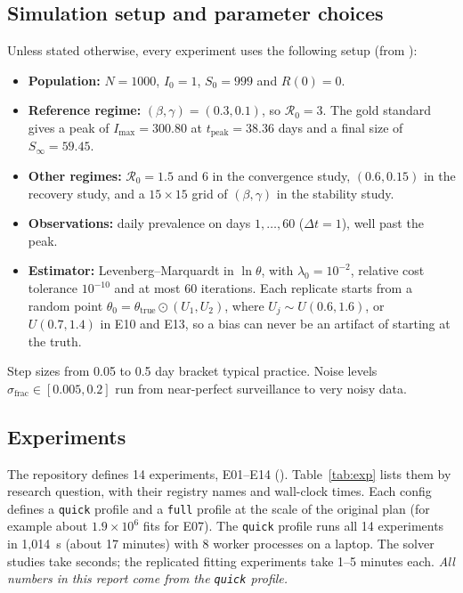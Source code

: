 \documentclass[sigconf]{acmart}
\begin{document}
\subsection{Simulation setup and parameter choices}
Unless stated otherwise, every experiment uses the following setup
(from ):
\begin{itemize}
  \item \textbf{Population:} $N=1000$, $I_0=1$, $S_0=999$ and $R(0)=0$.
  \item \textbf{Reference regime:} $(\beta,\gamma)=(0.3,0.1)$, so
    $\mathcal R_0=3$. The gold standard gives a peak of
    $I_{\max}=300.80$ at $t_{\mathrm{peak}}=38.36$ days and a final size
    of $S_\infty=59.45$.
  \item \textbf{Other regimes:} $\mathcal R_0=1.5$ and $6$ in the
    convergence study, $(0.6,0.15)$ in the recovery study, and a
    $15\times15$ grid of $(\beta,\gamma)$ in the stability study.
  \item \textbf{Observations:} daily prevalence on days $1,\dots,60$
    ($\Delta t=1$), well past the peak.
  \item \textbf{Estimator:} Levenberg--Marquardt in $\ln\theta$, with
    $\lambda_0=10^{-2}$, relative cost tolerance $10^{-10}$ and at most
    60 iterations. Each replicate starts from a random point
    $\theta_0=\theta_{\mathrm{true}}\odot(U_1,U_2)$, where
    $U_j\sim U(0.6,1.6)$, or $U(0.7,1.4)$ in E10 and E13, so a bias can
    never be an artifact of starting at the truth.
\end{itemize}
Step sizes from 0.05 to 0.5 day bracket typical practice. Noise levels
$\sigma_{\mathrm{frac}}\in[0.005,0.2]$ run from near-perfect surveillance
to very noisy data.

\subsection{Experiments}
The repository defines 14 experiments, E01--E14
(). Table~\ref{tab:exp} lists them by
research question, with their registry names and wall-clock times. Each
config defines a \texttt{quick} profile and a \texttt{full} profile at
the scale of the original plan (for example about $1.9\times10^6$ fits
for E07). The \texttt{quick} profile runs all 14 experiments in
1{,}014~s (about 17 minutes) with 8 worker processes on a laptop. The
solver studies take seconds; the replicated fitting experiments take
1--5 minutes each. \emph{All numbers in this report come from the
\texttt{quick} profile.}
\end{document}
